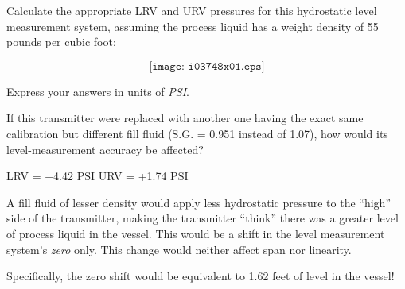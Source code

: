 

Calculate the appropriate LRV and URV pressures for this hydrostatic level measurement system, assuming the process liquid has a weight density of 55 pounds per cubic foot:

$$\texttt{[image: i03748x01.eps]}$$

Express your answers in units of {\it PSI}.

\vskip 10pt

If this transmitter were replaced with another one having the exact same calibration but different fill fluid (S.G. = 0.951 instead of 1.07), how would its level-measurement accuracy be affected?







LRV = +4.42 PSI \hskip 50pt URV = +1.74 PSI

\vskip 10pt

A fill fluid of lesser density would apply less hydrostatic pressure to the ``high'' side of the transmitter, making the transmitter ``think'' there was a greater level of process liquid in the vessel.  This would be a shift in the level measurement system's {\it zero} only.  This change would neither affect span nor linearity.

Specifically, the zero shift would be equivalent to 1.62 feet of level in the vessel!










